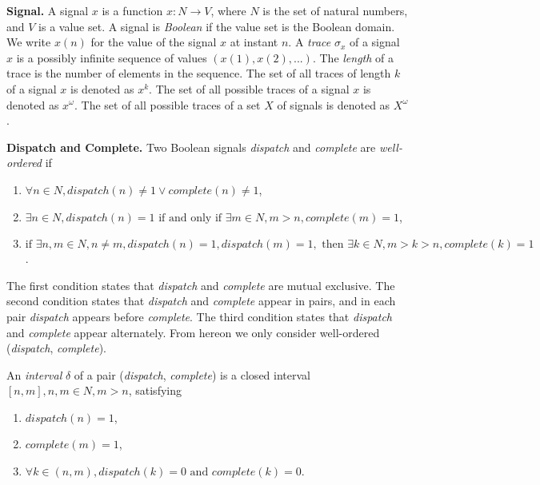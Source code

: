 {\bf Signal.}
A signal $x$ is a function $x: N \rightarrow V$, where $N$ is the set of natural numbers, and $V$ is a value set. 
A signal is \emph{Boolean} if the value set is the Boolean domain.
We write $x(n)$ for the value of the signal $x$ at instant $n$. 
A \emph{trace} $\sigma_x$ of a signal $x$ is a possibly infinite sequence of values $(x(1), x(2),... )$. 
The \emph{length} of a trace is the number of elements in the sequence. 
The set of all traces of length $k$ of a signal $x$ is denoted as $x^k$. 
The set of all possible traces of a signal $x$ is denoted as $x^{\omega}$. 
The set of all possible traces of a set $X$ of signals is denoted as $X^{\omega}$. 

{\bf Dispatch and Complete.}
Two Boolean signals \emph{dispatch} and \emph{complete} are \emph{well-ordered} if 

\begin{enumerate}
	\item $\forall n \in N, dispatch(n) \ne 1 \vee complete(n) \ne 1 $,
	\item $ \exists n\in N, dispatch(n) = 1 \text{ if and only if } \exists m\in N, m > n, complete(m) =  1 $,
	\item $ \text{if } \exists n,m\in N, n \neq m, dispatch(n) = 1, dispatch(m) = 1, \text{ then } \exists k\in N, m >k> n, complete(k) = 1 $.
\end{enumerate}

The first condition states that \emph{dispatch} and \emph{complete} are mutual exclusive. The second condition states that \emph{dispatch} and \emph{complete} appear in pairs, and in each pair \emph{dispatch} appears before \emph{complete}. The third condition states that \emph{dispatch} and \emph{complete} appear alternately. 
From hereon we only consider well-ordered (\emph{dispatch}, \emph{complete}).

An \emph{interval} $\delta$ of a pair (\emph{dispatch}, \emph{complete}) is a closed interval $[n, m], n,m \in N, m>n$, satisfying

\begin{enumerate}
	\item $ dispatch(n) = 1 $, 
	\item $ complete(m) = 1 $, 
	\item $ \forall k\in (n, m), dispatch(k)=0 \text{ and } complete(k)=0 $.
\end{enumerate}

